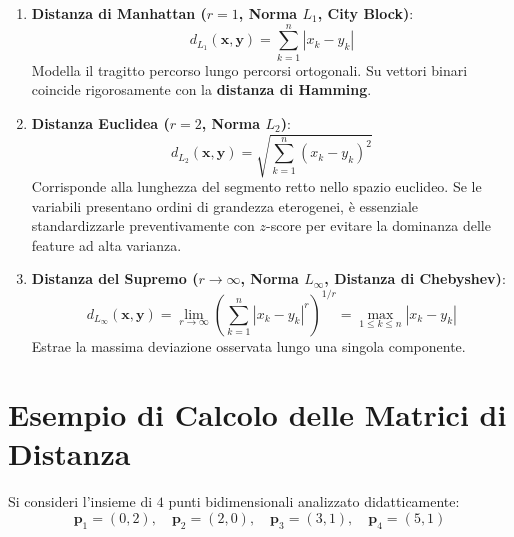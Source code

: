 \begin{enumerate}
    \item \textbf{Distanza di Manhattan ($r = 1$, Norma $L_1$, City Block)}:
    \begin{equation}
        d_{L_1}(\mathbf{x}, \mathbf{y}) = \sum_{k=1}^n |x_k - y_k|
    \end{equation}
    Modella il tragitto percorso lungo percorsi ortogonali. Su vettori binari coincide rigorosamente con la \textbf{distanza di Hamming}.
    \item \textbf{Distanza Euclidea ($r = 2$, Norma $L_2$)}:
    \begin{equation}
        d_{L_2}(\mathbf{x}, \mathbf{y}) = \sqrt{\sum_{k=1}^n (x_k - y_k)^2}
    \end{equation}
    Corrisponde alla lunghezza del segmento retto nello spazio euclideo. Se le variabili presentano ordini di grandezza eterogenei, è essenziale standardizzarle preventivamente con $z$-score per evitare la dominanza delle feature ad alta varianza.
    \item \textbf{Distanza del Supremo ($r \to \infty$, Norma $L_\infty$, Distanza di Chebyshev)}:
    \begin{equation}
        d_{L_\infty}(\mathbf{x}, \mathbf{y}) = \lim_{r \to \infty} \left( \sum_{k=1}^n |x_k - y_k|^r \right)^{1/r} = \max_{1 \le k \le n} |x_k - y_k|
    \end{equation}
    Estrae la massima deviazione osservata lungo una singola componente.
\end{enumerate}

\section{Esempio di Calcolo delle Matrici di Distanza}
\label{sec:dm-distance-matrix-example}

Si consideri l'insieme di $4$ punti bidimensionali analizzato didatticamente:
\begin{equation}
    \mathbf{p}_1 = (0, 2), \quad \mathbf{p}_2 = (2, 0), \quad \mathbf{p}_3 = (3, 1), \quad \mathbf{p}_4 = (5, 1)
\end{equation}

